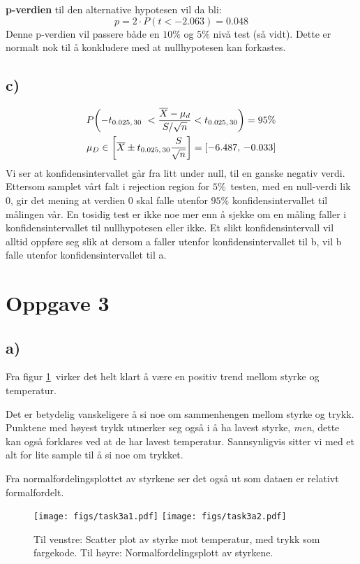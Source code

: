 \documentclass[12p,a4paper]{article}
\renewcommand{\bar}{\overline}
\begin{document}
\textbf{p-verdien} til den alternative hypotesen vil da bli:
\[
    p = 2\cdot P(t < -2.063) = 0.048
\]
Denne p-verdien vil passere både en $10\%$ og $5\%$ nivå test (så vidt). Dette er normalt nok til å konkludere med at nullhypotesen kan forkastes. 



\subsection*{c)}
\begin{align*}
    P\qty(-t_{0.025,\, 30} < \frac{\bar{X} - \mu_d}{S/\sqrt{n}} < t_{0.025,\, 30}) = 95\% \\
    \mu_D \in \qty[\bar{X} \pm t_{0.025,\, 30}\frac{S}{\sqrt{n}}] = \qty[-6.487,\, -0.033]
\end{align*}
Vi ser at konfidensintervallet går fra litt under null, til en ganske negativ verdi. Ettersom samplet vårt falt i rejection region for $5\%$ testen, med en null-verdi lik 0, gir det mening at verdien 0 skal falle utenfor $95\%$ konfidensintervallet til målingen vår. En tosidig test er ikke noe mer enn å sjekke om en måling faller i konfidensintervallet til nullhypotesen eller ikke. Et slikt konfidensintervall vil alltid oppføre seg slik at dersom a faller utenfor konfidensintervallet til b, vil b falle utenfor konfidensintervallet til a.


\section*{Oppgave 3}
\subsection*{a)}
Fra figur \ref{fig:3} virker det helt klart å være en positiv trend mellom styrke og temperatur. 

Det er betydelig vanskeligere å si noe om sammenhengen mellom styrke og trykk. Punktene med høyest trykk utmerker seg også i å ha lavest styrke, \textit{men}, dette kan også forklares ved at de har lavest temperatur. Sannsynligvis sitter vi med et alt for lite sample til å si noe om trykket.

Fra normalfordelingsplottet av styrkene ser det også ut som dataen er relativt formalfordelt. 

\begin{figure}[H]
    \centering
    \texttt{[image: figs/task3a1.pdf]}
    \texttt{[image: figs/task3a2.pdf]}
    \caption{Til venstre: Scatter plot av styrke mot temperatur, med trykk som fargekode. Til høyre: Normalfordelingsplott av styrkene.}
    \label{fig:3}
\end{figure}
\end{document}
